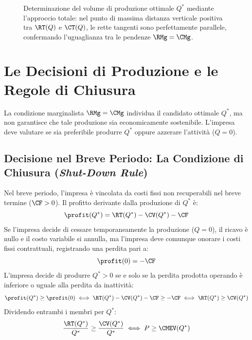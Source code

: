 \begin{figure}[htbp]
\caption{Determinazione del volume di produzione ottimale $Q^*$ mediante l'approccio totale: nel punto di massima distanza verticale positiva tra $\RT(Q)$ e $\CT(Q)$, le rette tangenti sono perfettamente parallele, confermando l'uguaglianza tra le pendenze $\RMg = \CMg$.}
\label{fig:massimizzazione_profitto_totale}
\end{figure}

\section{Le Decisioni di Produzione e le Regole di Chiusura}

La condizione marginalista $\RMg = \CMg$ individua il candidato ottimale $Q^*$, ma non garantisce che tale produzione sia economicamente sostenibile. L'impresa deve valutare se sia preferibile produrre $Q^*$ oppure azzerare l'attività ($Q=0$).

\subsection{Decisione nel Breve Periodo: La Condizione di Chiusura (\textit{Shut-Down Rule})}
Nel breve periodo, l'impresa è vincolata da costi fissi non recuperabili nel breve termine ($\CF > 0$). Il profitto derivante dalla produzione di $Q^*$ è:
\begin{equation}
    \profit(Q^*) = \RT(Q^*) - \CV(Q^*) - \CF
\end{equation}
Se l'impresa decide di cessare temporaneamente la produzione ($Q = 0$), il ricavo è nullo e il costo variabile si annulla, ma l'impresa deve comunque onorare i costi fissi contrattuali, registrando una perdita pari a:
\begin{equation}
    \profit(0) = -\CF
\end{equation}
L'impresa decide di produrre $Q^* > 0$ se e solo se la perdita prodotta operando è inferiore o uguale alla perdita da inattività:
\begin{equation}
    \profit(Q^*) \ge \profit(0) \iff \RT(Q^*) - \CV(Q^*) - \CF \ge -\CF \iff \RT(Q^*) \ge \CV(Q^*)
\end{equation}
Dividendo entrambi i membri per $Q^*$:
\begin{equation}
    \frac{\RT(Q^*)}{Q^*} \ge \frac{\CV(Q^*)}{Q^*} \iff P \ge \CMEV(Q^*)
    \label{eq:regola_chiusura_breve}
\end{equation}

